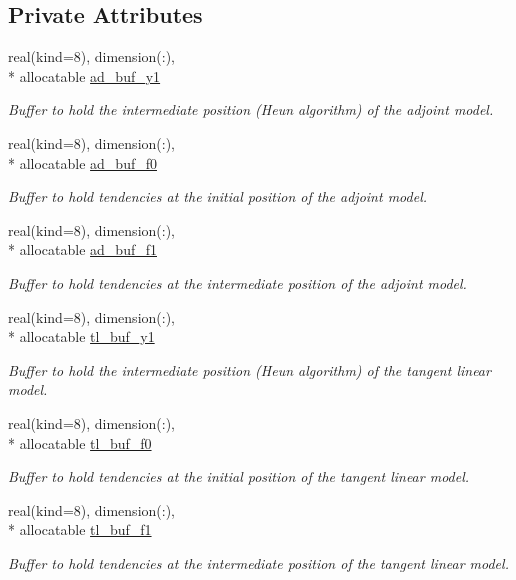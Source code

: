 \subsection*{Private Attributes}
\begin{DoxyCompactItemize}
\item 
real(kind=8), dimension(\-:), \\*
allocatable \hyperlink{classtl__ad__integrator_a7b9ea21348323bdf5900c7adc2bced11}{ad\-\_\-buf\-\_\-y1}
\begin{DoxyCompactList}\small\item\em Buffer to hold the intermediate position (Heun algorithm) of the adjoint model. \end{DoxyCompactList}\item 
real(kind=8), dimension(\-:), \\*
allocatable \hyperlink{classtl__ad__integrator_a75663e90f59d18f51a6ea0f7fba911ac}{ad\-\_\-buf\-\_\-f0}
\begin{DoxyCompactList}\small\item\em Buffer to hold tendencies at the initial position of the adjoint model. \end{DoxyCompactList}\item 
real(kind=8), dimension(\-:), \\*
allocatable \hyperlink{classtl__ad__integrator_a2508746d3cc1d3200a14181761e7a19f}{ad\-\_\-buf\-\_\-f1}
\begin{DoxyCompactList}\small\item\em Buffer to hold tendencies at the intermediate position of the adjoint model. \end{DoxyCompactList}\item 
real(kind=8), dimension(\-:), \\*
allocatable \hyperlink{classtl__ad__integrator_a5b09945b6da493a8256dd42eafd580ba}{tl\-\_\-buf\-\_\-y1}
\begin{DoxyCompactList}\small\item\em Buffer to hold the intermediate position (Heun algorithm) of the tangent linear model. \end{DoxyCompactList}\item 
real(kind=8), dimension(\-:), \\*
allocatable \hyperlink{classtl__ad__integrator_a52a1c9e0109041c0b07626e46af52038}{tl\-\_\-buf\-\_\-f0}
\begin{DoxyCompactList}\small\item\em Buffer to hold tendencies at the initial position of the tangent linear model. \end{DoxyCompactList}\item 
real(kind=8), dimension(\-:), \\*
allocatable \hyperlink{classtl__ad__integrator_ac77cf11c6f8291b74160743e557ba1dd}{tl\-\_\-buf\-\_\-f1}
\begin{DoxyCompactList}\small\item\em Buffer to hold tendencies at the intermediate position of the tangent linear model. \end{DoxyCompactList}\end{DoxyCompactItemize}


